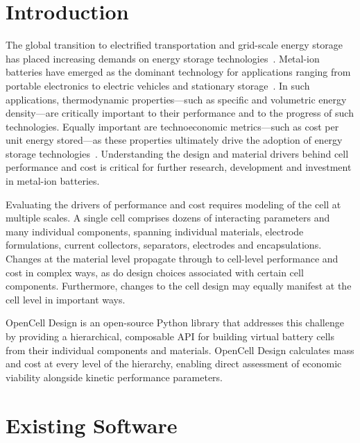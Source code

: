 \documentclass[12pt]{article}
\begin{document}
\section{Introduction}

The global transition to electrified transportation and grid-scale energy storage has placed increasing demands on energy storage technologies~\cite{chu2012opportunities,dunn2011electrical}. Metal-ion batteries have emerged as the dominant technology for applications ranging from portable electronics to electric vehicles and stationary storage~\cite{goodenough2013li,blomgren2017development}. In such applications, thermodynamic properties---such as specific and volumetric energy density---are critically important to their performance and to the progress of such technologies. Equally important are technoeconomic metrics---such as cost per unit energy stored---as these properties ultimately drive the adoption of energy storage technologies~\cite{nykvist2015rapidly,ziegler2021re}. Understanding the design and material drivers behind cell performance and cost is critical for further research, development and investment in metal-ion batteries.

Evaluating the drivers of performance and cost requires modeling of the cell at multiple scales. A single cell comprises dozens of interacting parameters and many individual components, spanning individual materials, electrode formulations, current collectors, separators, electrodes and encapsulations. Changes at the material level propagate through to cell-level performance and cost in complex ways, as do design choices associated with certain cell components. Furthermore, changes to the cell design may equally manifest at the cell level in important ways.

OpenCell Design is an open-source Python library that addresses this challenge by providing a hierarchical, composable API for building virtual battery cells from their individual components and materials. OpenCell Design calculates mass and cost at every level of the hierarchy, enabling direct assessment of economic viability alongside kinetic performance parameters.

\section{Existing Software}
\end{document}
